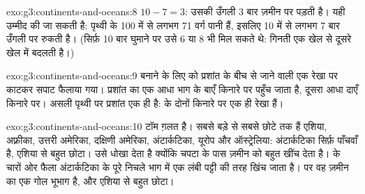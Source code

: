 \begin{solution}{exo:g3:continents-and-oceans:8}
$10 - 7 = 3$: उसकी उँगली 3 बार ज़मीन पर पड़ती है। यही उम्मीद की जा सकती है:
पृथ्वी के 100 में से लगभग 71 वर्ग पानी हैं, इसलिए 10 में से लगभग 7 बार उँगली
 पर रुकती है। (सिर्फ़ 10 बार घुमाने पर उसे 6 या 8 भी मिल सकते थे: गिनती
एक खेल से दूसरे खेल में बदलती है।)
\end{solution}

\begin{solution}{exo:g3:continents-and-oceans:9}
 बनाने के लिए  को प्रशांत  के बीच से जाने वाली एक
रेखा पर काटकर सपाट फैलाया गया। प्रशांत  का एक आधा भाग  के
बाएँ किनारे पर पहुँच जाता है, दूसरा आधा दाएँ किनारे पर। असली पृथ्वी पर
प्रशांत  एक ही है:  के दोनों किनारे  पर एक ही रेखा हैं।
\end{solution}

\begin{solution}{exo:g3:continents-and-oceans:10}
टॉम ग़लत है। सबसे बड़े से सबसे छोटे तक  हैं एशिया, अफ़्रीका, उत्तरी
अमेरिका, दक्षिणी अमेरिका, अंटार्कटिका, यूरोप और ऑस्ट्रेलिया: अंटार्कटिका सिर्फ़
पाँचवाँ है, एशिया से बहुत छोटा।  उसे धोखा देता है क्योंकि चपटा
  के पास ज़मीन को बहुत खींच देता है।  के चारों ओर
फैला अंटार्कटिका  के पूरे निचले भाग में एक लंबी पट्टी की तरह खिंच
जाता है।  पर वह ज़मीन का एक गोल भूभाग है, और एशिया से बहुत छोटा।
\end{solution}
